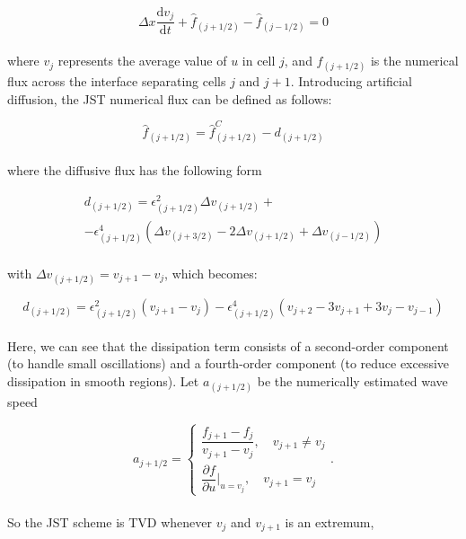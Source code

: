 \documentclass[a5paper]{sapthesis}
\begin{document}
	\begin{equation}
		\Delta x \dfrac{\mathrm{d} v_j}{\mathrm{d} t} + \hat{f}_{(j+1/2)} -  \hat{f}_{(j-1/2)} = 0
		\label{semidiscretescheme}
	\end{equation} 
	\\
	where $v_j$ represents the average value of $u$ in cell $j$, and $f_{(j+1/2)}$ is the numerical flux across the interface separating cells $j$ and $j+1$. 
	Introducing artificial diffusion, the JST numerical flux can be defined as follows:
	
	\begin{equation}
		\hat{f}_{(j+1/2)} = \hat{f}^C_{(j+1/2)} - d_{(j+1/2)}
	\end{equation}
	\\
	where the diffusive flux has the following form
	
	\begin{equation}
		\begin{aligned}
			d_{(j+1/2)} = \epsilon^2_{(j+1/2)} \Delta v_{(j+1/2)} +\\
			- \epsilon^4_{(j+1/2)}(\Delta v_{(j+3/2)} - 2\Delta v_{(j+1/2)} + \Delta v_{(j-1/2)})
		\end{aligned}		
	\end{equation}
	\\
	with $\Delta v_{(j+1/2)} = v_{j+1} -v_j$, which becomes:
	
	\begin{equation}
		d_{(j+1/2)} = \epsilon^2_{(j+1/2)} (v_{j+1}-v_j) - \epsilon^4_{(j+1/2)}(v_{j+2}-3v_{j+1}+3v_j-v_{j-1})
	\end{equation}
	\\
	Here, we can see that the dissipation term consists of a second-order component (to handle small oscillations) and a fourth-order component (to reduce excessive dissipation in smooth regions). 
	Let $a_{(j+1/2)}$ be the numerically estimated wave speed
	
	\begin{equation}
		a_{j+1/2} = 
		\begin{cases}
			\dfrac{f_{j+1}-f_j}{v_{j+1}-v_j}, \quad v_{j+1} \neq v_j \\[0.6cm]
			\dfrac{\partial f}{\partial u}\bigg\rvert_{u=v_j}, \quad v_{j+1} = v_j 
		\end{cases}.
	\end{equation}
	\\
	So the JST scheme is TVD whenever $v_j$ and $v_{j+1}$ is an extremum,
	
\end{document}
